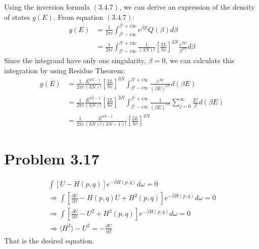 \documentclass{article}
\begin{document}
    Using the inversion formula $(3.4.7)$, we can derive an expression of the density of states $g(E)$. From equation $(3.4.7)$:
    \begin{equation}
    \begin{aligned}
        g(E)&=\frac{1}{2\pi i}\int_{\beta'-i\infty}^{\beta'+i\infty}e^{\beta E}Q(\beta)d\beta\\
            &=\frac{1}{2\pi i}\int_{\beta'-i\infty}^{\beta'+i\infty}\frac{1}{(3N)!}\left[\frac{2L}{hc}\right]^{3N}\frac{e^{\beta E}}{\beta^{3N}}d\beta
    \end{aligned}
        \label{JC_Li_003}
    \end{equation}
    Since the integrand have only one singularity, $\beta=0$, we can calculate this integration by using Residue Theorem:
    \begin{equation}
    \begin{aligned}
        g(E)&=\frac{1}{2\pi i}\frac{E^{3N-1}}{(3N)!}\left[\frac{2L}{hc}\right]^{3N}\int_{\beta'-i\infty}^{\beta'+i\infty}\frac{e^{\beta E}}{(\beta E)^{3N}}d(\beta E)\\
            &=\frac{1}{2\pi i}\frac{E^{3N-1}}{(3N)!}\left[\frac{2L}{hc}\right]^{3N}\int_{\beta'-i\infty}^{\beta'+i\infty}\frac{1}{(\beta E)^{3N}}\sum_{j=0}^{\infty}\frac{E^j}{j!} d(\beta E)\\
            &=\frac{1}{2\pi i}\frac{E^{3N-1}}{(3N)!(3N-1)!}\left[\frac{2L}{hc}\right]^{3N}
    \end{aligned}
        \label{JC_Li_004}
    \end{equation}


\section*{Problem 3.17}
\begin{eqnarray*}
\int [U-H(p,q)]e^{-\beta H(p,q)}d\omega=0 \\
\Rightarrow \int [\frac{\partial U}{\partial \beta}-H(p,q)U+H^2(p,q)]e^{-\beta H(p,q)}d\omega=0 \\
\Rightarrow \int [\frac{\partial U}{\partial \beta}-U^2+H^2(p,q)]e^{-\beta H(p,q)}d\omega=0  \\
\Rightarrow \langle H^2\rangle-U^2=-\frac{\partial U}{\partial \beta}
\end{eqnarray*}
That is the desired equation.
\end{document}
